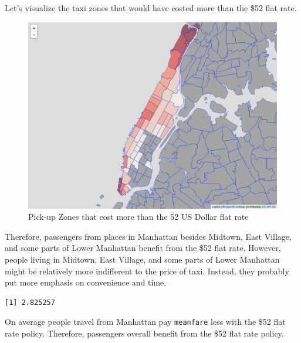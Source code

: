 \documentclass[12pt,twoside]{reedthesis}
\newenvironment{Shaded}{\begin{snugshade}}{\end{snugshade}}
\newcommand{\KeywordTok}[1]{\textcolor[rgb]{0.13,0.29,0.53}{\textbf{#1}}}
\newcommand{\StringTok}[1]{\textcolor[rgb]{0.31,0.60,0.02}{#1}}
\newcommand{\OperatorTok}[1]{\textcolor[rgb]{0.81,0.36,0.00}{\textbf{#1}}}
\newcommand{\NormalTok}[1]{#1}
\theoremstyle{definition}
\theoremstyle{definition}
\theoremstyle{definition}
\theoremstyle{remark}
\begin{document}
Let's visualize the taxi zones that would have costed more than the \$52
flat rate.
\begin{figure}

{\centering \includegraphics[width=4.96in]{figure/to_jfk_fare_above_vis} 

}

\caption{Pick-up Zones that cost more than the 52 US Dollar flat rate}\label{fig:to-jkf-fare-above-vis}
\end{figure}
Therefore, passengers from places in Manhattan besides Midtown, East
Village, and some parts of Lower Manhattan benefit from the \$52 flat
rate. However, people living in Midtown, East Village, and some parts of
Lower Manhattan might be relatively more indifferent to the price of
taxi. Instead, they probably put more emphasis on convenience and time.
\begin{Shaded}
\end{Shaded}
\begin{verbatim}
[1] 2.825257
\end{verbatim}
\begin{Shaded}
\end{Shaded}
On average people travel from Manhattan pay \texttt{meanfare} less with
the \$52 flat rate policy. Therefore, passengers overall benefit from
the \$52 flat rate policy.
\end{document}
